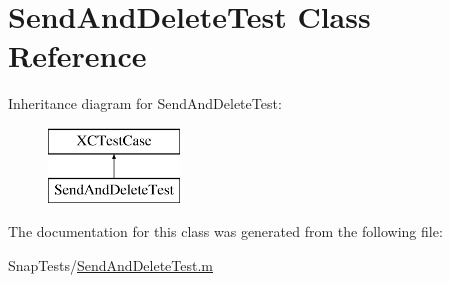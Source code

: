 \hypertarget{interface_send_and_delete_test}{}\section{Send\+And\+Delete\+Test Class Reference}
\label{interface_send_and_delete_test}
Inheritance diagram for Send\+And\+Delete\+Test\+:\begin{figure}[H]
\begin{center}
\leavevmode
\includegraphics[height=2.000000cm]{interface_send_and_delete_test}
\end{center}
\end{figure}


The documentation for this class was generated from the following file\+:\begin{DoxyCompactItemize}
\item 
Snap\+Tests/\hyperlink{_send_and_delete_test_8m}{Send\+And\+Delete\+Test.\+m}\end{DoxyCompactItemize}
